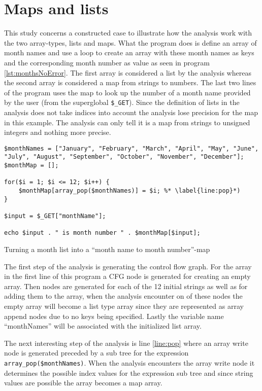 \section{Maps and lists}
This study concerns a constructed case to illustrate how the analysis work with the two array-types, lists and maps. What the program does is define an array of month names and use a loop to create an array with these month names as keys and the corresponding month number as value as seen in program \ref{lst:monthsNoError}. The first array is considered a list by the analysis whereas the second array is considered a map from strings to numbers. The last two lines of the program uses the map to look up the number of a month name provided by the user (from the superglobal \texttt{\$\_GET}). Since the definition of lists in the analysis does not take indices into account the analysis lose precision for the map in this example. The analysis can only tell it is a map from strings to unsigned integers and nothing more precise.

\begin{program}
\begin{lstlisting}
$monthNames = ["January", "February", "March", "April", "May", "June", "July", "August", "September", "October", "November", "December"];
$monthMap = [];

for($i = 1; $i <= 12; $i++) {
	$monthMap[array_pop($monthNames)] = $i; %* \label{line:pop}*)
}

$input = $_GET["monthName"];

echo $input . " is month number " . $monthMap[$input];
\end{lstlisting}
\caption{Turning a month list into a ``month name to month number''-map}
\label{lst:monthsNoError}
\end{program}

The first step of the analysis is generating the control flow graph. For the array in the first line of this program a CFG node is generated for creating an empty array. Then nodes are generated for each of the 12 initial strings as well as for adding them to the array, when the analysis encounter on of these nodes the empty array will become a list type array since they are represented as array append nodes due to no keys being specified. Lastly the variable name ``monthNames'' will be associated with the initialized list array.

The next interesting step of the analysis is line \ref{line:pop} where an array write node is generated preceded by a sub tree for the expression \texttt{array\_pop(\$monthNames)}. When the analysis encounters the array write node it determines the possible index values for the expression sub tree and since string values are possible the array becomes a map array.


